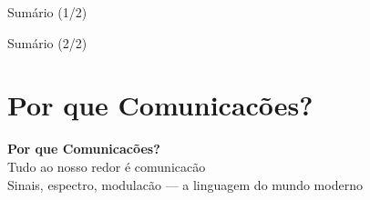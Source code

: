 \documentclass[aspectratio=169]{beamer}
\title{\tituloApresentacao}
\subtitle{\subtituloApresentacao}
\author{\autorNome}
\institute{\institutoFinal}
\date{\dataApresentacao}
\begin{document}
\begin{frame}
\titlepage
\end{frame}

\begin{frame}{Sum\'{a}rio (1/2)}
\tableofcontents[hideallsubsections, sections={1-3}]
\end{frame}

\begin{frame}{Sum\'{a}rio (2/2)}
\tableofcontents[hideallsubsections, sections={4-6}]
\end{frame}

\section{Por que Comunicac\~{o}es?}

{
\begin{frame}[plain,c]
\begin{center}
{\Huge\textbf{Por que Comunicac\~{o}es?}}\\[0.8cm]
{\LARGE Tudo ao nosso redor \'{e} comunicac\~{a}o}\\[0.5cm]
{\large Sinais, espectro, modulac\~{a}o --- a linguagem do mundo moderno}
\end{center}
\end{frame}
}
\end{document}
